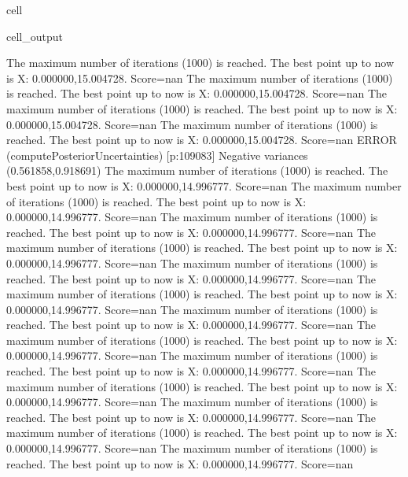 \documentclass[letterpaper,10pt,english]{jupyterBook}
\begin{document}
\begin{sphinxuseclass}{cell}
\begin{sphinxVerbatimOutput}
\begin{sphinxuseclass}{cell_output}
\begin{sphinxVerbatim}[commandchars=\\\{\}]
The maximum number of iterations (1000) is reached. The best point up to now is X: \PYGZob{}0.000000,15.004728\PYGZcb{}. Score=\PYGZhy{}nan
The maximum number of iterations (1000) is reached. The best point up to now is X: \PYGZob{}0.000000,15.004728\PYGZcb{}. Score=\PYGZhy{}nan
The maximum number of iterations (1000) is reached. The best point up to now is X: \PYGZob{}0.000000,15.004728\PYGZcb{}. Score=\PYGZhy{}nan
The maximum number of iterations (1000) is reached. The best point up to now is X: \PYGZob{}0.000000,15.004728\PYGZcb{}. Score=\PYGZhy{}nan
ERROR (compute\PYGZus{}Posterior\PYGZus{}Uncertainties) [p:109083] Negative variances (0.561858,\PYGZhy{}0.918691)
The maximum number of iterations (1000) is reached. The best point up to now is X: \PYGZob{}0.000000,14.996777\PYGZcb{}. Score=\PYGZhy{}nan
The maximum number of iterations (1000) is reached. The best point up to now is X: \PYGZob{}0.000000,14.996777\PYGZcb{}. Score=\PYGZhy{}nan
The maximum number of iterations (1000) is reached. The best point up to now is X: \PYGZob{}0.000000,14.996777\PYGZcb{}. Score=\PYGZhy{}nan
The maximum number of iterations (1000) is reached. The best point up to now is X: \PYGZob{}0.000000,14.996777\PYGZcb{}. Score=\PYGZhy{}nan
The maximum number of iterations (1000) is reached. The best point up to now is X: \PYGZob{}0.000000,14.996777\PYGZcb{}. Score=\PYGZhy{}nan
The maximum number of iterations (1000) is reached. The best point up to now is X: \PYGZob{}0.000000,14.996777\PYGZcb{}. Score=\PYGZhy{}nan
The maximum number of iterations (1000) is reached. The best point up to now is X: \PYGZob{}0.000000,14.996777\PYGZcb{}. Score=\PYGZhy{}nan
The maximum number of iterations (1000) is reached. The best point up to now is X: \PYGZob{}0.000000,14.996777\PYGZcb{}. Score=\PYGZhy{}nan
The maximum number of iterations (1000) is reached. The best point up to now is X: \PYGZob{}0.000000,14.996777\PYGZcb{}. Score=\PYGZhy{}nan
The maximum number of iterations (1000) is reached. The best point up to now is X: \PYGZob{}0.000000,14.996777\PYGZcb{}. Score=\PYGZhy{}nan
The maximum number of iterations (1000) is reached. The best point up to now is X: \PYGZob{}0.000000,14.996777\PYGZcb{}. Score=\PYGZhy{}nan
The maximum number of iterations (1000) is reached. The best point up to now is X: \PYGZob{}0.000000,14.996777\PYGZcb{}. Score=\PYGZhy{}nan
The maximum number of iterations (1000) is reached. The best point up to now is X: \PYGZob{}0.000000,14.996777\PYGZcb{}. Score=\PYGZhy{}nan

\end{sphinxVerbatim}
\end{sphinxuseclass}
\end{sphinxVerbatimOutput}
\end{sphinxuseclass}
\end{document}
